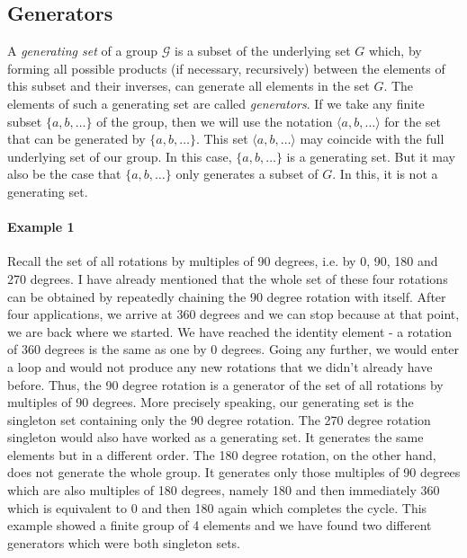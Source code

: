 \subsection{Generators}


A \emph{generating set} of a group $\mathcal{G}$ is a subset of the underlying set $G$ which, by forming all possible products (if necessary, recursively) between the elements of this subset and their inverses, can generate all elements in the set $G$. The elements of such a generating set are called \emph{generators}. If we take any finite subset $\{ a, b, \ldots \}$ of the group, then we will use the notation $\langle a, b, \ldots \rangle$ for the set that can be generated by $\{ a, b, \ldots \}$. This set $\langle a, b, \ldots \rangle$ may coincide with the full underlying set of our group. In this case, $\{ a, b, \ldots \}$ is a generating set. But it may also be the case that $\{ a, b, \ldots \}$ only generates a subset of $G$. In this, it is not a generating set.


\paragraph{Example 1} Recall the set of all rotations by multiples of 90 degrees, i.e. by 0, 90, 180 and 270 degrees. I have already mentioned that the whole set of these four rotations can be obtained by repeatedly chaining the 90 degree rotation with itself. After four applications, we arrive at 360 degrees and we can stop because at that point, we are back where we started. We have reached the identity element - a rotation of 360 degrees is the same as one by 0 degrees. Going any further, we would enter a loop and would not produce any new rotations that we didn't already have before. Thus, the 90 degree rotation is a generator of the set of all rotations by multiples of 90 degrees. More precisely speaking, our generating set is the singleton set containing only the 90 degree rotation. The 270 degree rotation singleton would also have worked as a generating set. It generates the same elements but in a different order. The 180 degree rotation, on the other hand, does not generate the whole group. It generates only those multiples of 90 degrees which are also multiples of 180 degrees, namely 180 and then immediately 360 which is equivalent to 0 and then 180 again which completes the cycle. This example showed a finite group of 4 elements and we have found two different generators which were both singleton sets.

